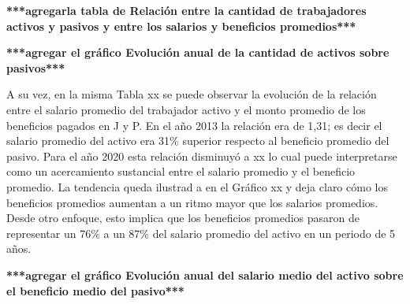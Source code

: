 \textbf{***agregarla tabla de Relación entre la cantidad de trabajadores activos y pasivos y entre los salarios y beneficios promedios***}

\textbf{***agregar el gráfico Evolución anual de la cantidad de activos sobre pasivos***}

A su vez, en la misma Tabla xx se puede observar la evolución de la
relación entre el salario promedio del trabajador activo y el monto
promedio de los beneficios pagados en J y P. En el año 2013 la relación
era de 1,31; es decir el salario promedio del activo era 31\% superior
respecto al beneficio promedio del pasivo. Para el año 2020 esta
relación disminuyó a xx lo cual puede interpretarse como un acercamiento
sustancial entre el salario promedio y el beneficio promedio. La
tendencia queda ilustrad a en el Gráfico xx y deja claro cómo los
beneficios promedios aumentan a un ritmo mayor que los salarios
promedios. Desde otro enfoque, esto implica que los beneficios promedios
pasaron de representar un 76\% a un 87\% del salario promedio del activo
en un periodo de 5 años.

\textbf{***agregar el gráfico Evolución anual del salario medio del activo sobre el beneficio medio del pasivo***}
